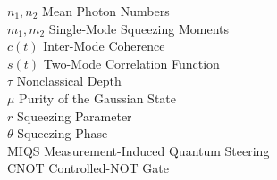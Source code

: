 \documentclass[12pt,a4paper]{report}
\begin{document}
\begin{tabbing}
	$n_1, n_2$ \> Mean Photon Numbers \\
	$m_1, m_2$ \> Single-Mode Squeezing Moments \\
	$c(t)$  \> Inter-Mode Coherence \\
	$s(t)$  \> Two-Mode Correlation Function \\

	$\tau$  \> Nonclassical Depth \\
	$\mu$   \> Purity of the Gaussian State \\
	$r$     \> Squeezing Parameter \\
	$\theta$ \> Squeezing Phase \\

	MIQS    \> Measurement-Induced Quantum Steering \\
	CNOT    \> Controlled-NOT Gate \\

\end{tabbing}

\newpage

\titleformat{\chapter}[display]{\vspace{7.5cm}\Large\bfseries\centering}{\chaptername~\thechapter}{1ex}{}

















% 
\end{document}
